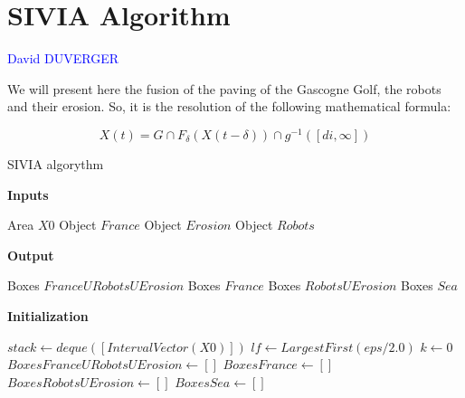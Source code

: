 
\section{SIVIA Algorithm}

\vspace{0.3 cm}
	
	\textcolor{blue} {David DUVERGER}
	
	\vspace{0.5 cm}
	
	We will present here the fusion of the paving of the Gascogne Golf, the robots and their erosion. So, it is the resolution of the following mathematical formula:
	
	$$X(t) = G \cap F_{\delta}(X(t-\delta)) \cap g^{-1}([di,\infty])$$
	

\begin{algorithm}
  \caption{SIVIA algorythm}
  \vspace{0.5 cm}
  \textbf{Inputs}%
  \begin{algorithmic}[1]
    \STATE Area $X0$
    \STATE Object $France$
    \STATE Object $Erosion$
    \STATE Object $Robots$
  \end{algorithmic}
  \bigskip

  \textbf{Output}%
  \begin{algorithmic}[1]

    \STATE Boxes $France U Robots U Erosion$
    \STATE Boxes $France$
   	\STATE Boxes $Robots U Erosion$
   	\STATE Boxes $Sea$
  \end{algorithmic}
  \bigskip
  
  \textbf{Initialization}%
  \begin{algorithmic}[1]
   	\STATE $stack\gets deque([IntervalVector(X0)])$
	\STATE $lf\gets LargestFirst(eps/2.0)$
	\STATE $k\gets 0$ 
	\STATE $BoxesFranceURobotsUErosion\gets []$
	\STATE $BoxesFrance\gets []$
	\STATE $BoxesRobotsUErosion\gets []$
	\STATE $BoxesSea\gets []$
  \end{algorithmic}
  
\end{algorithm}




\newpage

\vfill


